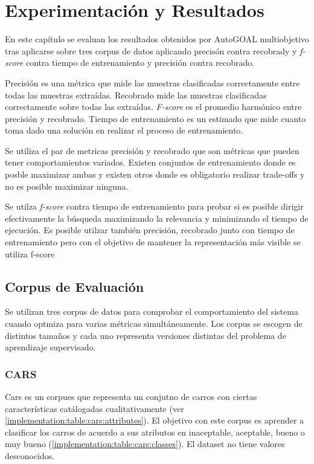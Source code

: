 \chapter{Experimentaci\'on y Resultados}\label{chapter:experiments}
En este cap\'itulo se evaluan los resultados obtenidos por AutoGOAL multiobjetivo tras aplicarse sobre tres corpus de datos aplicando precis\'on contra recobrady y \textit{f-score} contra tiempo de entrenamiento y precisi\'on contra recobrado.

Precisi\'on es una m\'etrica que mide las muestras clasificadas correctamente entre todas las muestras extra\'idas. Recobrado mide las muestras clasificadas correctamente sobre todas las extra\'idas.
\textit{F-score} es el promedio harm\'onico entre precisi\'on y recobrado.
Tiempo de entrenamiento es un estimado que mide cuanto toma dado una soluci\'on en realizar el proceso de entrenamiento.

Se utiliza el par de metricas precisi\'on y recobrado que son m\'etricas que pueden tener comportamientos variados. Existen conjuntos de entrenamiento donde es posble maximizar ambas y existen otros donde es obligatorio realizar trade-offs y no es posible maximizar ninguna.

Se utilza \textit{f-score} contra tiempo de entrenamiento para probar si es posible dirigir efectivamente  la b\'usqueda maximizando la relevancia y minimizando el tiempo de ejecuci\'on. Es posible utilzar tambi\'en precisi\'on, recobrado junto con tiempo de entrenamiento pero con el objetivo de mantener la representaci\'on m\'as visible se utiliza f-score

\section{Corpus de Evaluaci\'on}
Se utilizan tres corpus de datos para comprobar el comportamiento del sistema cuando optmiza para varias m\'etricas simult\'aneamente. Los corpus se escogen de distintos tamaños y cada uno representa versiones distintas del problema de aprendizaje supervisado.

\subsection{CARS}
Cars es un corpues que representa un conjutno de carros con ciertas caracter\'isticas cat\'alogadas cualitativamente (ver \ref{implementation:table:cars:attributes}). El objetivo con este corpus es aprender a clasificar los carros de  acuerdo a sus atributos  en inaceptable, aceptable, bueno o muy bueno (\ref{implementation:table:cars:classes}). El dataset no tiene valores desconocidos.

